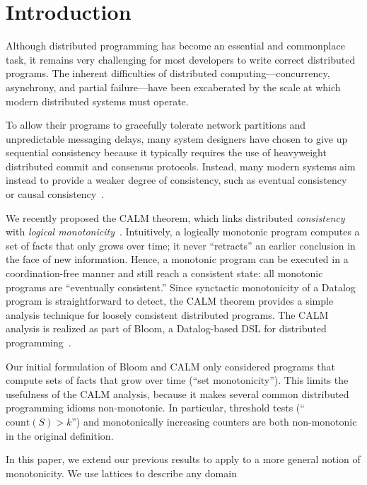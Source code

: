 \section{Introduction}
\label{sec:intro}
Although distributed programming has become an essential and commonplace task,
it remains very challenging for most developers to write correct distributed
programs. The inherent difficulties of distributed computing---concurrency,
asynchrony, and partial failure---have been excaberated by the scale at which
modern distributed systems must operate.

To allow their programs to gracefully tolerate network partitions and
unpredictable messaging delays, many system designers have chosen to give up
sequential consistency because it typically requires the use of heavyweight
distributed commit and consensus protocols. Instead, many modern systems aim
instead to provide a weaker degree of consistency, such as eventual
consistency~\cite{Terry1995} or causal consistency~\cite{Lloyd2011}.

We recently proposed the CALM theorem, which links distributed
\emph{consistency} with \emph{logical
  monotonicity}~\cite{Alvaro2011,Hellerstein2010}. Intuitively, a logically
monotonic program computes a set of facts that only grows over time; it never
``retracts'' an earlier conclusion in the face of new information. Hence, a
monotonic program can be executed in a coordination-free manner and still reach
a consistent state: all monotonic programs are ``eventually consistent.'' Since
synctactic monotonicity of a Datalog program is straightforward to detect, the
CALM theorem provides a simple analysis technique for loosely consistent
distributed programs. The CALM analysis is realized as part of Bloom, a
Datalog-based DSL for distributed programming~\cite{bloom}.

Our initial formulation of Bloom and CALM only considered programs that compute
sets of facts that grow over time (``set monotonicity''). This limits the
usefulness of the CALM analysis, because it makes several common distributed
programming idioms non-monotonic. In particular, threshold tests (``$\textrm{count}(S) >
k$'') and monotonically increasing counters are both non-monotonic in the
original definition.

In this paper, we extend our previous results to apply to a more general notion
of monotonicity. We use lattices to describe any domain 

